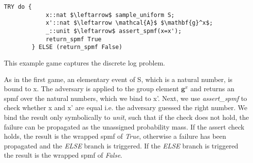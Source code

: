 \begin{example}
    \label{assert_spmf_exmpl}
    \hspace{0mm}
    \begin{lstlisting}[language=isabelle]
        TRY do {
            x::nat $\leftarrow$ sample_uniform S;
            x'::nat $\leftarrow \mathcal{A}$ $\mathbf{g}^x$;
            _::unit $\leftarrow$ assert_spmf(x=x');
            return_spmf True
        } ELSE (return_spmf False)
    \end{lstlisting}

    This example game captures the discrete log problem.

    As in the first game, an elementary event of S, which is a natural number, is bound to x. The adversary is applied to the group element $\mathbf{g}^x$ and returns an spmf over the natural numbers, which we bind to x'.
    Next, we use \textit{assert\_spmf} to check whether x and x' are equal i.e. the adversary guessed the right number. We bind the result only symbolically to \textit{unit}, such that if the check does not hold, the failure can be propagated as the unassigned probability mass. If the assert check holds, the result is the wrapped spmf of \textit{True}, otherwise a failure has been propagated and the \textit{ELSE} branch is triggered. 
    If the \textit{ELSE} branch is triggered the result is the wrapped spmf of \textit{False}.

\end{example}